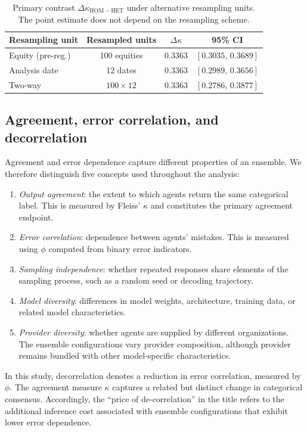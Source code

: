\documentclass{ieeeaccess}
\begin{document}
\begin{table}[!t]
\centering
\caption{Primary contrast $\Delta\kappa_{\mathrm{HOM-HET}}$ under alternative
resampling units. The point estimate does not depend on the resampling scheme.}
\label{tab:clustering}
\small
\setlength{\tabcolsep}{4pt}
\begin{tabular}{@{}lccc@{}}
\toprule
Resampling unit & Resampled units & $\Delta\kappa$ & 95\% CI \\
\midrule
Equity (pre-reg.) & 100 equities & 0.3363 & $[0.3035,\,0.3689]$ \\
Analysis date & 12 dates & 0.3363 & $[0.2989,\,0.3656]$ \\
Two-way & $100\times 12$ & 0.3363 & $[0.2786,\,0.3877]$ \\
\bottomrule
\end{tabular}
\end{table}

\subsection{Agreement, error correlation, and decorrelation}
\label{subsec:errcorr}
Agreement and error dependence capture different properties of an ensemble. We
therefore distinguish five concepts used throughout the analysis:

\begin{enumerate}
\item \emph{Output agreement}: the extent to which agents return the same
categorical label. This is measured by Fleiss' $\kappa$ and constitutes the
primary agreement endpoint.
\item \emph{Error correlation}: dependence between agents' mistakes. This is
measured using $\phi$ computed from binary error indicators.
\item \emph{Sampling independence}: whether repeated responses share elements of
the sampling process, such as a random seed or decoding trajectory.
\item \emph{Model diversity}: differences in model weights, architecture,
training data, or related model characteristics.
\item \emph{Provider diversity}: whether agents are supplied by different
organizations. The ensemble configurations vary provider composition, although
provider remains bundled with other model-specific characteristics.
\end{enumerate}

In this study, decorrelation denotes a reduction in error correlation, measured
by $\phi$. The agreement measure $\kappa$ captures a related but distinct change
in categorical consensus. Accordingly, the ``price of de-correlation'' in the
title refers to the additional inference cost associated with ensemble
configurations that exhibit lower error dependence.
\end{document}
